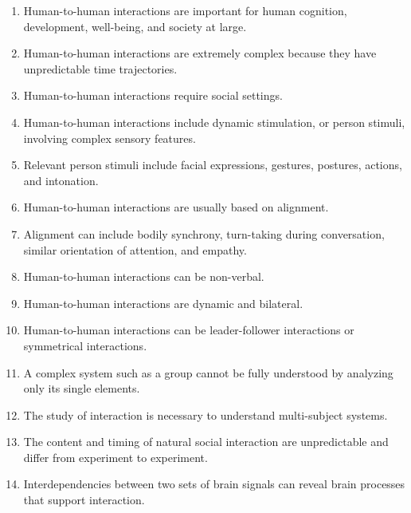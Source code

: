 \begin{enumerate}[label=\arabic*.]
    \item Human-to-human interactions are important for human cognition, development, well-being, and society at large.
    
    \item Human-to-human interactions are extremely complex because they have unpredictable time trajectories.
    
    \item Human-to-human interactions require social settings.
    
    \item Human-to-human interactions include dynamic stimulation, or person stimuli, involving complex sensory features.
    
    \item Relevant person stimuli include facial expressions, gestures, postures, actions, and intonation.
    
    \item Human-to-human interactions are usually based on alignment.
    
    \item Alignment can include bodily synchrony, turn-taking during conversation, similar orientation of attention, and empathy.
    
    \item Human-to-human interactions can be non-verbal.
    
    \item Human-to-human interactions are dynamic and bilateral.
    
    \item Human-to-human interactions can be leader-follower interactions or symmetrical interactions.
    
    \item A complex system such as a group cannot be fully understood by analyzing only its single elements.
    
    \item The study of interaction is necessary to understand multi-subject systems.
    
    \item The content and timing of natural social interaction are unpredictable and differ from experiment to experiment.
    
    \item Interdependencies between two sets of brain signals can reveal brain processes that support interaction.
    

\end{enumerate}
